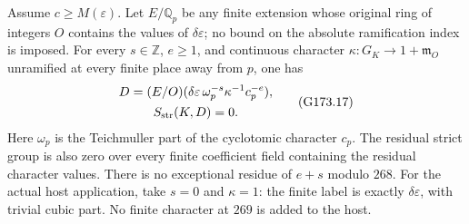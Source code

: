 \begin{theorem}
\label{AC-G173}
Assume $c\geq M(\varepsilon)$.
Let $E/\mathbb Q_p$ be any finite extension whose original ring of
integers $O$ contains the values of $\delta\varepsilon$; no bound on
the absolute ramification index is imposed.
For every $s\in\mathbb Z$, $e\geq1$, and continuous character
$\kappa:G_K\to1+\mathfrak m_O$ unramified at every finite place
away from $p$, one has
\[
 \begin{gathered}
 D=(E/O)(\delta\varepsilon\,\omega_p^{-s}\kappa^{-1}c_p^{-e}),\\
                             S_{\rm str}(K,D)=0.
 \end{gathered}
 \tag{G173.17}
\]
Here $\omega_p$ is the Teichmuller part of the cyclotomic character
$c_p$.  The residual strict group is also zero over every finite
coefficient field containing the residual character values.
There is no exceptional residue of $e+s$ modulo $268$.
For the actual host application, take $s=0$ and $\kappa=1$:
the finite label is exactly $\delta\varepsilon$, with trivial
cubic part.  No finite character at $269$ is added to the host.
\end{theorem}


